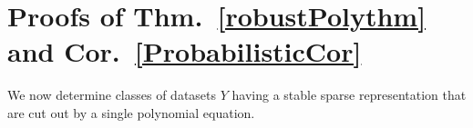\documentclass[9pt,twocolumn]{pnas-new}
\begin{document}

\section{Proofs of Thm.~\ref{robustPolythm} and Cor.~\ref{ProbabilisticCor}}\label{AppendixB} %


We now determine classes of datasets $Y$ having a stable sparse representation that are cut out by a single polynomial equation.
\end{document}
